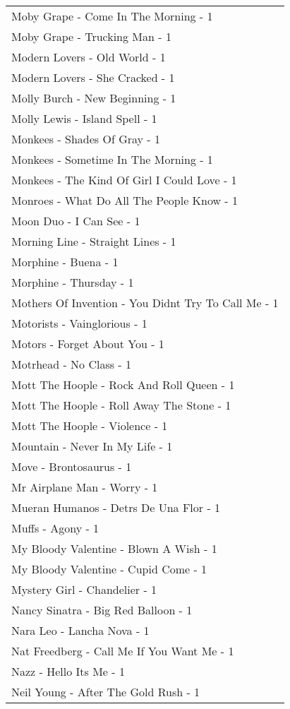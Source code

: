 \documentclass[
]{article}
\begin{document}
\begin{longtable}{l}
Moby Grape - Come In The Morning - 1 \\ 
Moby Grape - Trucking Man - 1 \\ 
Modern Lovers - Old World - 1 \\ 
Modern Lovers - She Cracked - 1 \\ 
Molly Burch - New Beginning - 1 \\ 
Molly Lewis - Island Spell - 1 \\ 
Monkees - Shades Of Gray - 1 \\ 
Monkees - Sometime In The Morning - 1 \\ 
Monkees - The Kind Of Girl I Could Love - 1 \\ 
Monroes - What Do All The People Know - 1 \\ 
Moon Duo - I Can See - 1 \\ 
Morning Line - Straight Lines - 1 \\ 
Morphine - Buena - 1 \\ 
Morphine - Thursday - 1 \\ 
Mothers Of Invention - You Didnt Try To Call Me - 1 \\ 
Motorists - Vainglorious - 1 \\ 
Motors - Forget About You - 1 \\ 
Motrhead - No Class - 1 \\ 
Mott The Hoople - Rock And Roll Queen - 1 \\ 
Mott The Hoople - Roll Away The Stone - 1 \\ 
Mott The Hoople - Violence - 1 \\ 
Mountain - Never In My Life - 1 \\ 
Move - Brontosaurus - 1 \\ 
Mr Airplane Man - Worry - 1 \\ 
Mueran Humanos - Detrs De Una Flor - 1 \\ 
Muffs - Agony - 1 \\ 
My Bloody Valentine - Blown A Wish - 1 \\ 
My Bloody Valentine - Cupid Come - 1 \\ 
Mystery Girl - Chandelier - 1 \\ 
Nancy Sinatra - Big Red Balloon - 1 \\ 
Nara Leo - Lancha Nova - 1 \\ 
Nat Freedberg - Call Me If You Want Me - 1 \\ 
Nazz - Hello Its Me - 1 \\ 
Neil Young - After The Gold Rush - 1 \\ 

\end{longtable}
\end{document}
